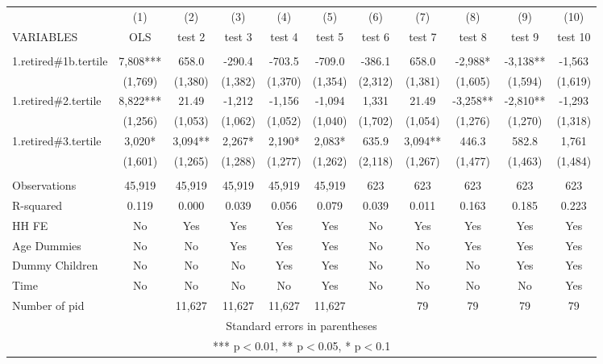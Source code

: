 \begin{tabular}{lcccccccccc} \hline
 & (1) & (2) & (3) & (4) & (5) & (6) & (7) & (8) & (9) & (10) \\
VARIABLES & OLS & test 2 & test 3 & test 4 & test 5 & test 6 & test 7 & test 8 & test 9 & test 10 \\ \hline
 &  &  &  &  &  &  &  &  &  &  \\
1.retired\#1b.tertile & 7,808*** & 658.0 & -290.4 & -703.5 & -709.0 & -386.1 & 658.0 & -2,988* & -3,138** & -1,563 \\
 & (1,769) & (1,380) & (1,382) & (1,370) & (1,354) & (2,312) & (1,381) & (1,605) & (1,594) & (1,619) \\
1.retired\#2.tertile & 8,822*** & 21.49 & -1,212 & -1,156 & -1,094 & 1,331 & 21.49 & -3,258** & -2,810** & -1,293 \\
 & (1,256) & (1,053) & (1,062) & (1,052) & (1,040) & (1,702) & (1,054) & (1,276) & (1,270) & (1,318) \\
1.retired\#3.tertile & 3,020* & 3,094** & 2,267* & 2,190* & 2,083* & 635.9 & 3,094** & 446.3 & 582.8 & 1,761 \\
 & (1,601) & (1,265) & (1,288) & (1,277) & (1,262) & (2,118) & (1,267) & (1,477) & (1,463) & (1,484) \\
 &  &  &  &  &  &  &  &  &  &  \\
Observations & 45,919 & 45,919 & 45,919 & 45,919 & 45,919 & 623 & 623 & 623 & 623 & 623 \\
R-squared & 0.119 & 0.000 & 0.039 & 0.056 & 0.079 & 0.039 & 0.011 & 0.163 & 0.185 & 0.223 \\
HH FE & No & Yes & Yes & Yes & Yes & No & Yes & Yes & Yes & Yes \\
Age Dummies & No & No & Yes & Yes & Yes & No & No & Yes & Yes & Yes \\
Dummy Children & No & No & No & Yes & Yes & No & No & No & Yes & Yes \\
Time & No & No & No & No & Yes & No & No & No & No & Yes \\
 Number of pid &  & 11,627 & 11,627 & 11,627 & 11,627 &  & 79 & 79 & 79 & 79 \\ \hline
\multicolumn{11}{c}{ Standard errors in parentheses} \\
\multicolumn{11}{c}{ *** p$<$0.01, ** p$<$0.05, * p$<$0.1} \\
\end{tabular}
